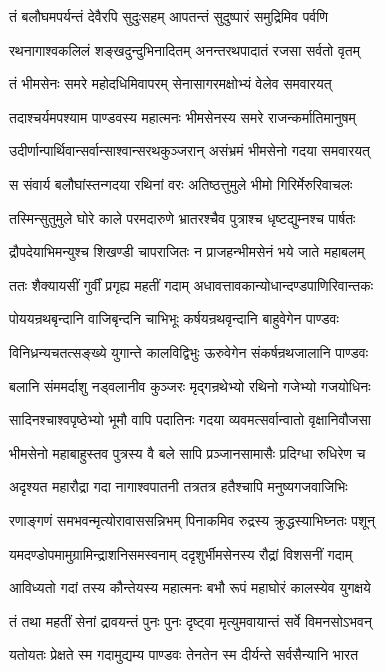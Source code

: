 \twolineshloka
{तं बलौघमपर्यन्तं देवैरपि सुदुःसहम्}
{आपतन्तं सुदुष्पारं समुद्रिमिव पर्वणि}


\twolineshloka
{रथनागाश्वकलिलं शङ्खदुन्दुभिनादितम्}
{अनन्तरथपादातं रजसा सर्वतो वृतम्}


\twolineshloka
{तं भीमसेनः समरे महोदधिमिवापरम्}
{सेनासागरमक्षोभ्यं वेलेव समवारयत्}


\twolineshloka
{तदाश्चर्यमपश्याम पाण्डवस्य महात्मनः}
{भीमसेनस्य समरे राजन्कर्मातिमानुषम्}


\twolineshloka
{उदीर्णान्पार्थिवान्सर्वान्साश्वान्सरथकुञ्जरान्}
{असंभ्रमं भीमसेनो गदया समवारयत्}


\twolineshloka
{स संवार्य बलौघांस्तन्गदया रथिनां वरः}
{अतिष्ठत्तुमुले भीमो गिरिर्मेरुरिवाचलः}


\twolineshloka
{तस्मिन्सुतुमुले घोरे काले परमदारुणे}
{भ्रातरश्चैव पुत्राश्च धृष्टद्युम्नश्च पार्षतः}


\twolineshloka
{द्रौपदेयाभिमन्युश्च शिखण्डी चापराजितः}
{न प्राजहन्भीमसेनं भये जाते महाबलम्}


\twolineshloka
{ततः शैक्यायसीं गुर्वीं प्रगृह्य महतीं गदाम्}
{अधावत्तावकान्योधान्दण्डपाणिरिवान्तकः}


\twolineshloka
{पोययन्रथबृन्दानि वाजिबृन्दनि चाभिभूः}
{कर्षयन्रथवृन्दानि बाहुवेगेन पाण्डवः}


\twolineshloka
{विनिध्रन्यचतत्सङ्ख्ये युगान्ते कालविद्विभुः}
{ऊरुवेगेन संकर्षन्रथजालानि पाण्डवः}


\twolineshloka
{बलानि संममर्दाशु नड्वलानीव कुञ्जरः}
{मृद्गन्रथेभ्यो रथिनो गजेभ्यो गजयोधिनः}


\twolineshloka
{सादिनश्चाश्वपृष्ठेभ्यो भूमौ वापि पदातिनः}
{गदया व्यवमत्सर्वान्वातो वृक्षानिवौजसा}


\twolineshloka
{भीमसेनो महाबाहुस्तव पुत्रस्य वै बले}
{सापि प्रञ्जानसामासैः प्रदिग्धा रुधिरेण च}


\twolineshloka
{अदृश्यत महारौद्रा गदा नागाश्वपातनी}
{तत्रतत्र हतैश्चापि मनुष्यगजवाजिभिः}


\twolineshloka
{रणाङ्गणं समभवन्मृत्योरावाससन्निभम्}
{पिनाकमिव रुद्रस्य क्रुद्धस्याभिघ्नतः पशून्}


\twolineshloka
{यमदण्डोपमामुग्रामिन्द्राशनिसमस्वनाम्}
{ददृशुर्भीमसेनस्य रौद्रां विशसनीं गदाम्}


\twolineshloka
{आविध्यतो गदां तस्य कौन्तेयस्य महात्मनः}
{बभौ रूपं महाघोरं कालस्येव युगक्षये}


\twolineshloka
{तं तथा महतीं सेनां द्रावयन्तं पुनः पुनः}
{दृष्ट्वा मृत्युमवायान्तं सर्वे विमनसोऽभवन्}


\twolineshloka
{यतोयतः प्रेक्षते स्म गदामुद्यम्य पाण्डवः}
{तेनतेन स्म दीर्यन्ते सर्वसैन्यानि भारत}


